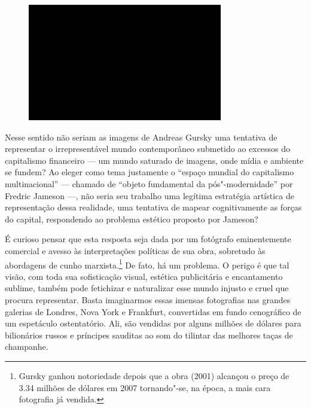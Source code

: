 \begin{figure}[!ht]

\centering
 \includegraphics[width=85mm]{./imgs/im1.jpg}
\caption{\tiny{}}

\end{figure}

Nesse sentido não seriam as imagens de Andreas Gursky uma tentativa de
representar o irrepresentável mundo contemporâneo submetido ao excessos
do capitalismo financeiro --- um mundo saturado de imagens, onde mídia e
ambiente se fundem? Ao eleger como tema justamente o ``espaço mundial do
capitalismo multinacional'' --- chamado de ``objeto fundamental da
pós"-modernidade'' por Fredric Jameson ---, não seria seu trabalho uma legítima
estratégia artística de representação dessa realidade, uma tentativa de
mapear cognitivamente as forças do capital, respondendo ao problema
estético proposto por Jameson?

É curioso pensar que esta resposta seja dada por um fotógrafo
eminentemente comercial e avesso às interpretações políticas de sua
obra, sobretudo às abordagens de cunho marxista.\footnote{Gursky ganhou
  notoriedade depois que a obra {} (2001)
  alcançou o preço de 3.34 milhões de dólares em 2007 tornando"-se, na
  época, a mais cara fotografia já vendida.} De fato, há um problema. O
perigo é que tal visão, com toda sua sofisticação visual, estética
publicitária e encantamento sublime, também pode fetichizar e
naturalizar esse mundo injusto e cruel que procura representar. Basta
imaginarmos essas imensas fotografias nas grandes galerias de Londres,
Nova York e Frankfurt, convertidas em fundo cenográfico de um espetáculo
ostentatório. Ali, são vendidas por alguns milhões de dólares para
bilionários russos e príncipes sauditas ao som do tilintar das melhores
taças de champanhe.

